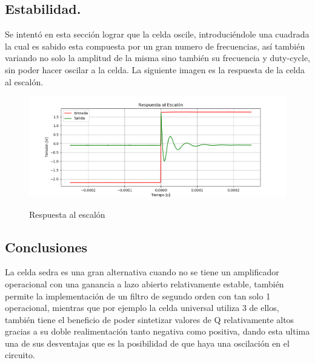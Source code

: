 \subsection{Estabilidad.}
Se intentó en esta sección lograr que la celda oscile, introduciéndole una cuadrada la cual es sabido esta compuesta por un gran numero de frecuencias, así también variando no solo la amplitud de la misma sino también su frecuencia y duty-cycle, sin poder hacer oscilar a la celda. La siguiente imagen es la respuesta de la celda al escalón.
\begin{figure}[H]
	\centering
	\includegraphics[width=\textwidth]{Imagenes-Ej3/Step.png}
	\label{fig:stepresponse}
	\caption{Respuesta al escalón}
\end{figure}
\subsection{Conclusiones}
La celda sedra es una gran alternativa cuando no se tiene un amplificador operacional con una ganancia a lazo abierto relativamente estable, también permite la implementación de un filtro de segundo orden con tan solo 1 operacional, mientras que por ejemplo la celda universal utiliza 3 de ellos, también tiene el beneficio de poder sintetizar valores de Q relativamente altos gracias a su doble realimentación tanto negativa como positiva, dando esta ultima una de sus desventajas que es la posibilidad de que haya una oscilación en el circuito.
%

